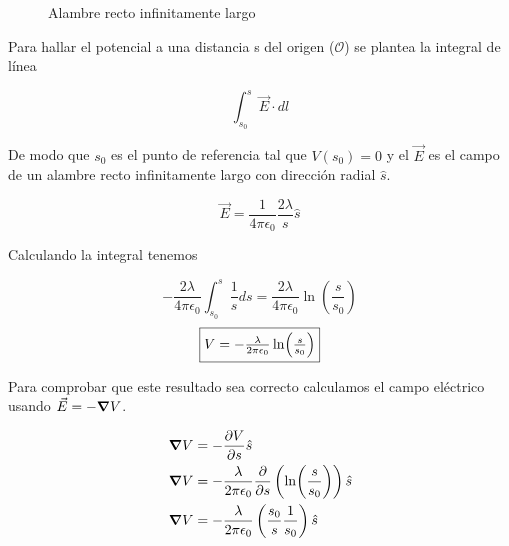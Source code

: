 \documentclass{article}
\begin{document}
\begin{figure}[h]
  \centering
\caption{Alambre recto infinitamente largo}
\end{figure}

Para hallar el potencial a una distancia s del origen ($\mathcal{O}$) se plantea la integral de línea

\[
  \int_{s_{0}}^{s}  \vec{E} \cdot dl 
\]

De modo que $s_{0}$ es el punto de referencia tal que $V(s_{0})=0$ y el $\vec{E}$ es el campo de un alambre recto infinitamente largo con dirección radial $\hat{s}$.

\[
  \vec{E} = \frac{1}{4\pi \epsilon_{0}} \frac{2\lambda}{s} \hat{s}
\]

Calculando la integral tenemos

\[ -\frac{2\lambda}{4\pi \epsilon_{0}} \int_{s_{0}}^{s} \frac{1}{s} ds =  \frac{2\lambda}{4\pi{} \epsilon_{0}} \ln(\frac{s}{s_{0}}) \]
\[ \fbox{$V = -\frac{\lambda}{2\pi{} \epsilon_{0}} \ln(\frac{s}{s_{0}})$} \]

Para comprobar que este resultado sea correcto calculamos el campo eléctrico usando $\vec{E} = -\grad{V}$. 

\begin{align*}
  \grad{V} &= -\frac{\partial V}{\partial s} \hat{s} \\
  \grad{V} &=  -\frac{\lambda}{2\pi \epsilon_{0}} \frac{\partial}{\partial s} \left(\ln(\frac{s}{s_{0}})\right) \hat{s}\\
  \grad{V} &=  -\frac{\lambda}{2\pi \epsilon_{0}} \left( \frac{s_{0}}{s} \frac{1}{s_0} \right) \hat{s}
\end{align*}

\begin{center}
\end{center}
\end{document}
